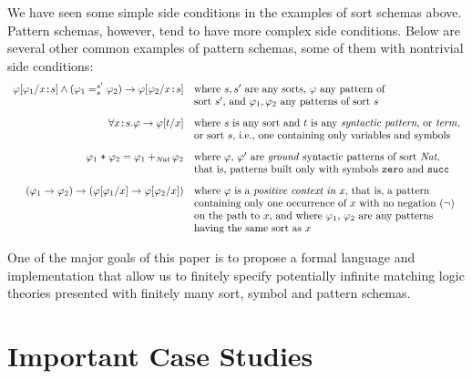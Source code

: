 \documentclass[UTF8,11pt]{article}
\theoremstyle{plain}
\theoremstyle{definition}
\theoremstyle{remark}
\newcommand{\cln}{\texttt{:}}
\newcommand{\Nat}{\textit{Nat}}
\begin{document}
We have seen some simple side conditions in the examples of sort schemas
above.
Pattern schemas, however, tend to have more complex side conditions.
Below are several other common examples of pattern schemas, some of them
with nontrivial side conditions:
$$
\begin{array}{rl}
\varphi[\varphi_1/{x\cln s}] \wedge (\varphi_1 =_s^{s'} \varphi_2) \rightarrow \varphi[\varphi_2/{x\cln s}]
&\textrm{where $s,s'$ are any sorts, $\varphi$ any pattern of} \\
& \textrm{sort $s'$, and $\varphi_1,\varphi_2$ any patterns of sort $s$}
\\[2ex]
\forall x\cln s . \varphi \rightarrow \varphi[t/x]
&\textrm{where $s$ is any sort and $t$ is any \emph{syntactic pattern}, or \emph{term}}, \\
& \textrm{or sort $s$, i.e., one containing only variables and symbols}
\\[2ex]
\varphi_1 \mathrel{\texttt{+}} \varphi_2 = \varphi_1 +_\Nat \varphi_2
& \textrm{where $\varphi$, $\varphi'$ are \emph{ground} syntactic patterns of sort $\Nat$,}
\\
&\textrm{that is, patterns built only with symbols \texttt{zero} and \texttt{succ}}
\\[2ex]
(\varphi_1 \rightarrow \varphi_2) \rightarrow
(\varphi[\varphi_1 / x] \rightarrow \varphi[\varphi_2 / x])
& \textrm{where $\varphi$ is a \emph{positive context in $x$}, that is, a pattern}
\\
& \textrm{containing only one occurrence of $x$ with no negation ($\neg$)}
\\
&\textrm{on the path to $x$, and where $\varphi_1$, $\varphi_2$ are any patterns}
\\
&\textrm{having the same sort as $x$}
\end{array}
$$

One of the major goals of this paper is to propose a formal language
and implementation that allow us to finitely specify potentially
infinite matching logic theories presented with finitely many sort, symbol
and pattern schemas.

\section{Important Case Studies}
\label{sec:case-studies}
\end{document}
